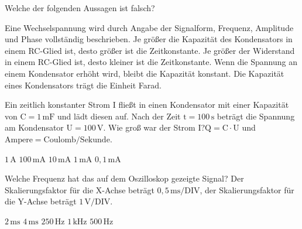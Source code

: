 \documentclass[11pt]{exam}
\begin{document}
\setlength{\voffset}{-0.5in}
\setlength{\headsep}{5pt}

\hspace{2mm}
 \hspace{5mm}
\vspace{4mm}

\begin{questions}

\question Welche der folgenden Aussagen ist falsch?

\begin{choices}
	\choice Eine Wechselspannung wird durch Angabe der Signalform, Frequenz, Amplitude und Phase vollständig beschrieben.
	\choice Je größer die Kapazität des Kondensators in einem RC-Glied ist, desto größer ist die Zeitkonstante.
	\choice Je größer der Widerstand in einem RC-Glied ist, desto kleiner ist die Zeitkonstante.
	\choice Wenn die Spannung an einem Kondensator erhöht wird, bleibt die Kapazität konstant.
	\choice Die Kapazität eines Kondensators trägt die Einheit Farad.
\end{choices}

\vspace{3mm}\question Ein zeitlich konstanter Strom \(\mathrm{I}\) fließt in einen Kondensator mit einer Kapazität von \(\mathrm{C=1\,mF}\) und lädt diesen auf. Nach der Zeit \(\mathrm{t=100\,s}\) beträgt die Spannung am Kondensator \(\mathrm{U=100\,V}\). Wie groß war der Strom \(\mathrm{I}\)?\(\mathrm{Q=C \cdot U}\) und \(\mathrm{Ampere=Coulomb/Sekunde}\).

\begin{choices}
	\choice \(\mathrm{1\,A}\)
	\choice \(\mathrm{100\,mA}\)
	\choice \(\mathrm{10\,mA}\)
	\choice \(\mathrm{1\,mA}\)
	\choice \(\mathrm{0,1\,mA}\)
\end{choices}

\vspace{3mm}\question Welche Frequenz hat das auf dem Oszilloskop gezeigte Signal? Der Skalierungsfaktor für die X-Achse beträgt \(\mathrm{0,5\,ms/DIV}\), der Skalierungsfaktor für die Y-Achse beträgt \(\mathrm{1\,V/DIV}\).

\begin{choices}
	\choice \(\mathrm{2\,ms}\)
	\choice \(\mathrm{4\,ms}\)
	\choice \(\mathrm{250\,Hz}\)
	\choice \(\mathrm{1\,kHz}\)
	\choice \(\mathrm{500\,Hz}\)
\end{choices}


\end{questions}
\end{document}
